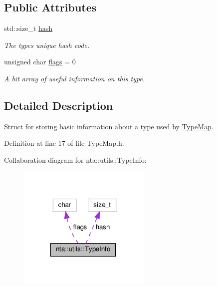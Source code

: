 \subsection*{Public Attributes}
\begin{DoxyCompactItemize}
\item 
\mbox{\label{structnta_1_1utils_1_1TypeInfo_a6587d744abd11e1cc0857994e6737cff}} 
std\+::size\+\_\+t \hyperlink{structnta_1_1utils_1_1TypeInfo_a6587d744abd11e1cc0857994e6737cff}{hash}
\begin{DoxyCompactList}\small\item\em The types unique hash code. \end{DoxyCompactList}\item 
\mbox{\label{structnta_1_1utils_1_1TypeInfo_aefa7e5c3119f80e44784fa624df7a397}} 
unsigned char \hyperlink{structnta_1_1utils_1_1TypeInfo_aefa7e5c3119f80e44784fa624df7a397}{flags} = 0
\begin{DoxyCompactList}\small\item\em A bit array of useful information on this type. \end{DoxyCompactList}\end{DoxyCompactItemize}


\subsection{Detailed Description}
Struct for storing basic information about a type used by \hyperlink{classnta_1_1utils_1_1TypeMap}{Type\+Map}. 

Definition at line 17 of file Type\+Map.\+h.



Collaboration diagram for nta\+:\+:utils\+:\+:Type\+Info\+:
\nopagebreak
\begin{figure}[H]
\begin{center}
\leavevmode
\includegraphics[width=180pt]{d4/db8/structnta_1_1utils_1_1TypeInfo__coll__graph}
\end{center}
\end{figure}


